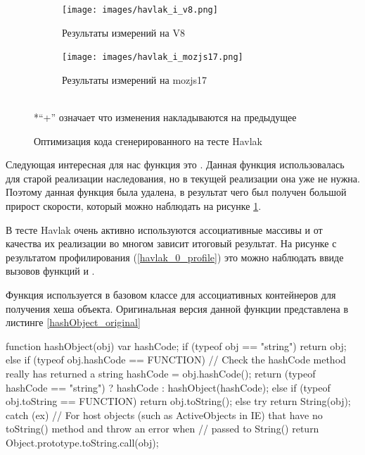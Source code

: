 \begin{figure}[ht!]
\centering
  \begin{subfigure}[b]{0.7\textwidth}
  \centering
  \texttt{[image: images/havlak\_i\_v8.png]}
  \caption{Результаты измерений на V8}
    \end{subfigure}

    \begin{subfigure}[b]{0.7\textwidth}
  \centering
  \texttt{[image: images/havlak\_i\_mozjs17.png]}
  \caption{Результаты измерений на mozjs17}
    \end{subfigure}
\\*``+'' означает что изменения накладываются на предыдущее
\caption{Оптимизация кода сгенерированного на тесте Havlak}
\label{havlak_i}
\end{figure}

Следующая интересная для нас функция это . Данная функция использовалась для старой реализации наследования, но в текущей реализации она уже не нужна. Поэтому данная функция была удалена, в результат чего был получен большой прирост скорости, который можно наблюдать на рисунке \ref{havlak_i}.

В тесте Havlak очень активно используются ассоциативные массивы и от качества их реализации во многом зависит итоговый результат.
На рисунке с результатом профилирования (\ref{havlak_0_profile}) это можно наблюдать ввиде вызовов функций  и .

Функция  используется в базовом классе для ассоциативных контейнеров  для получения хеша объекта. Оригинальная версия данной функции представлена в листинге \ref{hashObject_original}

\begin{code}
\begin{JavaScript}[caption=Оригинальная версия функции hashObject, label=hashObject_original]
function hashObject(obj) {
    var hashCode;
    if (typeof obj == "string") {
        return obj;
    }
    else if (typeof obj.hashCode == FUNCTION) {
        // Check the hashCode method really has returned a string
        hashCode = obj.hashCode();
        return (typeof hashCode == "string") ? hashCode : hashObject(hashCode);
    }
    else if (typeof obj.toString == FUNCTION) {
        return obj.toString();
    }
    else {
        try {
            return String(obj);
        }
        catch (ex) {
            // For host objects (such as ActiveObjects in IE) that have no toString() method and throw an error when
            // passed to String()
            return Object.prototype.toString.call(obj);
        }
    }
}
\end{JavaScript}
\end{code}


